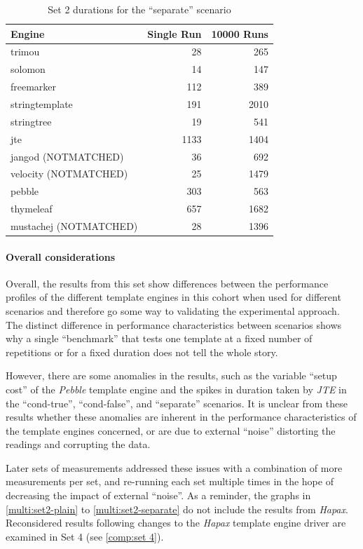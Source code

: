\begin{table}[!p]
\centering
\begin{tabular}{lrr}
\textbf{Engine} & \textbf{Single Run} & \textbf{10000 Runs} \\
\hline
trimou & 28 & 265 \\
solomon & 14 & 147 \\
freemarker & 112 & 389 \\
stringtemplate & 191 & 2010 \\
stringtree & 19 & 541 \\
jte & 1133 & 1404 \\
jangod (NOTMATCHED) & 36 & 692 \\
velocity (NOTMATCHED) & 25 & 1479 \\
pebble & 303 & 563 \\
thymeleaf & 657 & 1682 \\
mustachej (NOTMATCHED) & 28 & 1396 \\
\end{tabular}
\caption{Set 2 durations for the \enquote{separate} scenario\label{w2:results:separate}}
\end{table}

\paragraph{Overall considerations}

Overall, the results from this set show differences between the performance profiles of the different \gls{template engine}s in this cohort when used for different scenarios and therefore go some way to validating the experimental approach. The distinct difference in performance characteristics between scenarios shows why a single \enquote{benchmark} that tests one template at a fixed number of repetitions or for a fixed duration \citep{Hasselbring2021} does not tell the whole story.

However, there are some anomalies in the results, such as the variable \enquote{setup cost} of the \emph{Pebble} \gls{template engine} and the spikes in duration taken by \emph{JTE} in the \enquote{cond-true}, \enquote{cond-false}, and \enquote{separate} scenarios. It is unclear from these results whether these anomalies are inherent in the performance characteristics of the \gls{template engine}s concerned, or are due to external \enquote{noise} distorting the readings and corrupting the data.

Later sets of measurements addressed these issues with a combination of more measurements per set, and re-running each set multiple times in the hope of decreasing the impact of external \enquote{noise}. As a reminder, the graphs in \autoref{multi:set2-plain} to \autoref{multi:set2-separate} do not include the results from \emph{Hapax}. Reconsidered results following changes to the \emph{Hapax} \gls{template engine} driver are examined in Set 4 (see \autoref{comp:set 4}).

